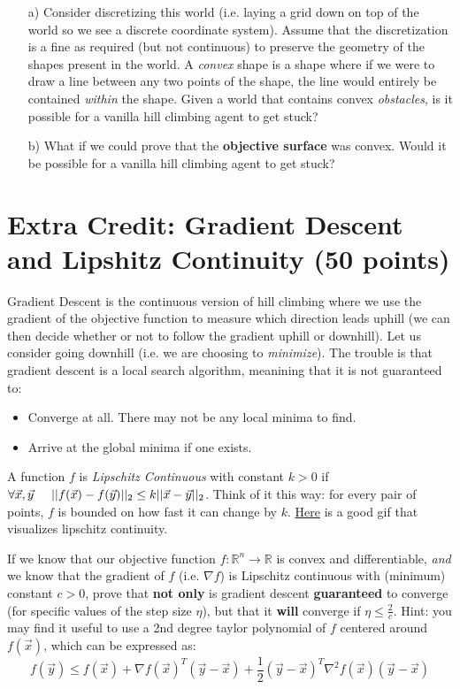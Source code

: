\documentclass[11pt]{article}
\newcommand{\question}[1]{\section*{\normalsize #1}}
\begin{document}
\begin{enumerate}
    \item[a)] Consider discretizing this world (i.e. laying a grid down on top of the world so we see a discrete coordinate system). Assume that the discretization is a fine as required (but not continuous) to preserve the geometry of the shapes present in the world. A \textit{convex} shape is a shape where if we were to draw a line between any two points of the shape, the line would entirely be contained \textit{within} the shape. Given a world that contains convex \textit{obstacles}, is it possible for a vanilla hill climbing agent to get stuck?

    \item[b)] What if we could prove that the \textbf{objective surface} was convex. Would it be possible for a vanilla hill climbing agent to get stuck?
\end{enumerate}
\newpage


\question{Extra Credit: Gradient Descent and Lipshitz Continuity (50 points)}
Gradient Descent is the continuous version of hill climbing where we use the gradient of the objective function to measure which direction leads uphill (we can then decide whether or not to follow the gradient uphill or downhill). Let us consider going downhill (i.e. we are choosing to \textit{minimize}). The trouble is that gradient descent is a local search algorithm, meanining that it is not guaranteed to:
\begin{itemize}
    \item Converge at all. There may not be any local minima to find.
    \item Arrive at the global minima if one exists.
\end{itemize}

\noindent A function $f$ is \textit{Lipschitz Continuous} with constant $k>0$ if $\forall \vec{x},\vec{y} \hspace{.5cm}||f(\vec{x})-f(\vec{y})||_2\le k||\vec{x}-\vec{y}||_2$. Think of it this way: for every pair of points, $f$ is bounded on how fast it can change by $k$. \href{https://en.wikipedia.org/wiki/Lipschitz_continuity}{Here} is a good gif that visualizes lipschitz continuity.\newline

\noindent If we know that our objective function $f: \mathbb{R}^n \rightarrow \mathbb{R}$ is convex and differentiable, \textit{and} we know that the gradient of $f$ (i.e. $\nabla f$) is Lipschitz continuous with (minimum) constant $c > 0$, prove that \textbf{not only} is gradient descent \textbf{guaranteed} to converge (for specific values of the step size $\eta$), but that it \textbf{will} converge if $\eta \le \frac{2}{c}$.\newline\newline
\noindent Hint: you may find it useful to use a 2nd degree taylor polynomial of $f$ centered around $f(\vec{x})$, which can be expressed as:
$$f(\vec{y}) \le f(\vec{x}) + \nabla f(\vec{x})^T (\vec{y}-\vec{x}) + \frac{1}{2}(\vec{y}-\vec{x})^T\nabla^2 f(\vec{x})(\vec{y}-\vec{x})$$
\end{document}
